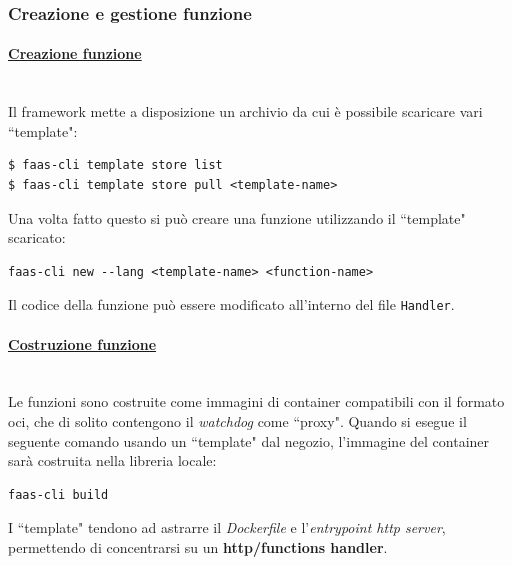 \documentclass[12pt,a4paper,openany,twoside]{book}
\begin{document}
\subsubsection{Creazione e gestione funzione}

\paragraph{\underline{Creazione funzione}} ~\\
Il framework mette a disposizione un archivio da cui è possibile scaricare vari ``template":
\begin{lstlisting}
$ faas-cli template store list
$ faas-cli template store pull <template-name>\end{lstlisting}
Una volta fatto questo si può creare una funzione utilizzando il ``template" scaricato:
\begin{lstlisting}
faas-cli new --lang <template-name> <function-name>\end{lstlisting}
Il codice della funzione può essere modificato all'interno del file \texttt{Handler}.

\paragraph{\underline{Costruzione funzione}} ~\\
Le funzioni sono costruite come immagini di container compatibili con il formato \ac{oci}, che di solito contengono il \textit{watchdog} come ``proxy". Quando si esegue il seguente comando usando un ``template" dal negozio, l'immagine del container sarà costruita nella libreria locale:
\begin{lstlisting}
faas-cli build\end{lstlisting}
I ``template" tendono ad astrarre il \textit{Dockerfile} e l'\textit{entrypoint \ac{http} server}, permettendo di concentrarsi su un \textbf{\ac{http}/functions handler}.
\end{document}
